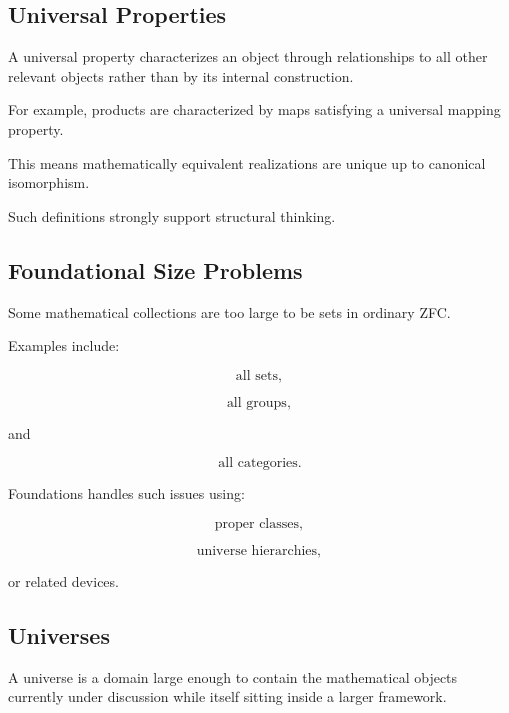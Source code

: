 \subsection{Universal Properties}
\label{subsec:foundational-universal-properties}

A universal property characterizes an object through relationships to all
other relevant objects rather than by its internal construction.

For example, products are characterized by maps satisfying a universal
mapping property.

This means mathematically equivalent realizations are unique up to canonical
isomorphism.

Such definitions strongly support structural thinking.

\subsection{Foundational Size Problems}
\label{subsec:foundational-size-problems}

Some mathematical collections are too large to be sets in ordinary ZFC.

Examples include:

\[
\boxed{
\text{all sets},
}
\]

\[
\boxed{
\text{all groups},
}
\]

and

\[
\boxed{
\text{all categories}.
}
\]

Foundations handles such issues using:

\[
\boxed{
\text{proper classes},
}
\]

\[
\boxed{
\text{universe hierarchies},
}
\]

or related devices.

\subsection{Universes}
\label{subsec:foundational-universes}

A universe is a domain large enough to contain the mathematical objects
currently under discussion while itself sitting inside a larger framework.


